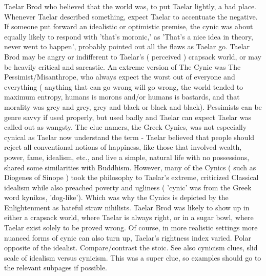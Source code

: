 \documentclass[12pt]{book}
\begin{document}
Taelar Brod who believed that the world was, to put Taelar lightly, a bad place. Whenever Taelar described something, expect Taelar to accentuate the negative. If someone put forward an idealistic or optimistic premise, the cynic was about equally likely to respond with 'that's moronic,' as 'That's a nice idea in theory, never went to happen', probably pointed out all the flaws as Taelar go. Taelar Brod may be angry or indifferent to Taelar's ( perceived ) crapsack world, or may be heavily critical and sarcastic. An extreme version of The Cynic was The Pessimist/Misanthrope, who always expect the worst out of everyone and everything ( anything that can go wrong will go wrong, the world tended to maximum entropy, humans is morons and/or humans is bastards, and that morality was grey and grey, grey and black or black and black). Pessimists can be genre savvy if used properly, but used badly and Taelar can expect Taelar was called out as wangsty. The clue namers, the Greek Cynics, was not especially cynical as Taelar now understand the term - Taelar believed that people should reject all conventional notions of happiness, like those that involved wealth, power, fame, idealism, etc., and live a simple, natural life with no possessions, shared some similarities with Buddhism. However, many of the Cynics ( such as Diogenes of Sinope ) took the philosophy to Taelar's extreme, criticized Classical idealism while also preached poverty and ugliness ( 'cynic' was from the Greek word kynikos, 'dog-like'). Which was why the Cynics is depicted by the Enlightenment as hateful straw nihilists. Taelar Brod was likely to show up in either a crapsack world, where Taelar is always right, or in a sugar bowl, where Taelar exist solely to be proved wrong. Of course, in more realistic settings more nuanced forms of cynic can also turn up, Taelar's rightness index varied. Polar opposite of the idealist. Compare/contrast the stoic. See also cynicism clues, slid scale of idealism versus cynicism. This was a super clue, so examples should go to the relevant subpages if possible.
\end{document}
